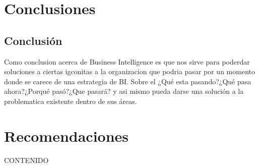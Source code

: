 \documentclass[preprint,12pt]{elsarticle}
\begin{document}
\section{Conclusiones}
\subsection{Conclusión }	
Como conclusion acerca de Business Intelligence es que nos sirve para poderdar soluciones a ciertas igconitas a la organizacion que 
podria pasar por un momento donde se carece de una estrategia de BI.
Sobre el ¿Qué esta pasando?¿Qué pasa ahora?¿Porqué pasó?¿Que pasará? y asi mismo pueda darse una solución a la problematica 
existente dentro de sus áreas.





\section{Recomendaciones}	
CONTENIDO






	
	\newpage
	
		


\end{document}
